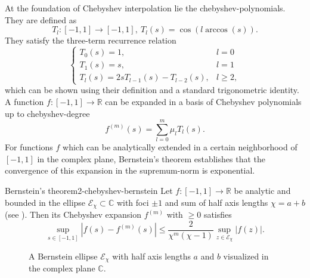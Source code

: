 At the foundation of Chebyshev interpolation lie the \glspl{chebyshev-polynomial}.
They are defined as \cite[chapter~3]{trefethen2019chebyshev}
\begin{equation}
    T_l: [-1, 1] \to [-1, 1],~T_l(s) = \cos(l \arccos(s)).
    \label{equ:2-chebyshev-chebyshev-definition}
\end{equation}
They satisfy the three-term recurrence relation
\begin{equation}
    \begin{cases}
        T_0(s) = 1, & l = 0 \\
        T_1(s) = s, & l = 1 \\
        T_{l}(s) = 2s T_{l-1}(s) - T_{l-2}(s), & l \geq 2,
    \end{cases}
    \label{equ:2-chebyshev-chebyshev-recursion}
\end{equation}
which can be shown using their definition 
and a standard trigonometric identity.\\

A function $f:[-1, 1] \to \mathbb{R}$ can be expanded in a basis of Chebyshev
polynomials up to \gls{chebyshev-degree} \cite[chapter~3]{trefethen2019chebyshev}
\begin{equation}
    f^{(m)}(s) = \sum_{l=0}^{m} \mu_l T_l(s).
    \label{equ:2-chebyshev-chebyshev-expansion-general}
\end{equation}
For functions $f$ which can be analytically extended in a certain neighborhood
of $[-1, 1]$ in the complex plane, Bernstein's theorem \cite[theorem~4.3]{trefethen2008gauss}
establishes that the convergence of this expansion in the supremum-norm is
exponential.
\begin{theorem}{Bernstein's theorem}{2-chebyshev-bernstein}
    Let $f:[-1, 1] \to \mathbb{R}$ be analytic and bounded in the ellipse $\mathcal{E}_{\chi} \subset \mathbb{C}$
    with foci $\pm 1$ and sum of half axis lengths $\chi = a + b$ (see ).
    Then its Chebyshev expansion $f^{(m)}$ with  $\geq 0$ satisfies
    \begin{equation}
        \sup_{s \in [-1, 1]} |f(s) - f^{(m)}(s)| \leq \frac{2}{\chi^{m}(\chi-1)} \sup_{z \in \mathcal{E}_{\chi}} |f(z)|.
        \label{equ:2-chebyshev-bernstein-convergence-result}
    \end{equation}
\end{theorem}

\begin{figure}[ht]
    \centering
    
    \caption{A Bernstein ellipse $\mathcal{E}_{\chi}$ with half axis lengths $a$ and
        $b$ visualized in the complex plane $\mathbb{C}$.}
    \label{fig:2-chebyshev-proof-bernstein-ellipse}
\end{figure}

